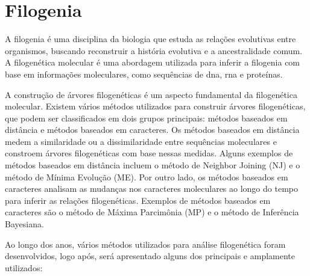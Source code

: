 \section{Filogenia}

A filogenia é uma disciplina da biologia que estuda as relações evolutivas entre organismos, buscando reconstruir a história evolutiva e a ancestralidade comum. A filogenética molecular é uma abordagem utilizada para inferir a filogenia com base em informações moleculares, como sequências de \gls{dna}, \gls{rna} e proteínas\cite{felsenstein_inferring_2004}.

A construção de árvores filogenéticas é um aspecto fundamental da filogenética molecular. Existem vários métodos utilizados para construir árvores filogenéticas, que podem ser classificados em dois grupos principais: métodos baseados em distância e métodos baseados em caracteres.
Os métodos baseados em distância medem a similaridade ou a dissimilaridade entre sequências moleculares e constroem árvores filogenéticas com base nessas medidas. Alguns exemplos de métodos baseados em distância incluem o método de Neighbor Joining (NJ) e o método de Mínima Evolução (ME).
Por outro lado, os métodos baseados em caracteres analisam as mudanças nos caracteres moleculares ao longo do tempo para inferir as relações filogenéticas. Exemplos de métodos baseados em caracteres são o método de Máxima Parcimônia (MP) e o método de Inferência Bayesiana\cite{swofford_phylogenetic_1996}.

Ao longo dos anos, vários métodos utilizados para análise filogenética foram desenvolvidos, logo após, será apresentado alguns dos principais e amplamente utilizados:

